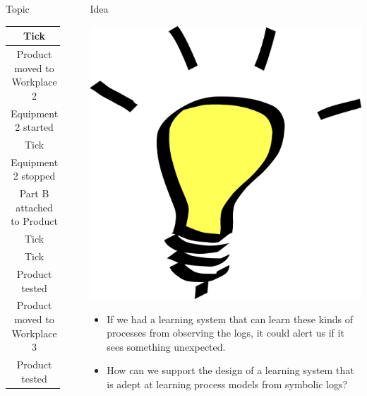 \documentclass[final,xcolor={usenames,x11names}]{beamer}
\newlength{\sepwid}
\newlength{\onecolwid}
\begin{document}
\begin{frame}[t]
\begin{columns}[t]
\begin{column}{\onecolwid}
\begin{alertblock}{Topic}
\begin{center}
{\begin{tabular}{|c|}
  \hline
  \cellcolor{PaleTurquoise1>wheel,4,5}
Tick
  \\
  \hline
  \cellcolor{PaleTurquoise1>wheel,1,5}
Product moved to Workplace 2
  \\
  \hline
  \cellcolor{PaleTurquoise1>wheel,2,5}
Equipment 2 started
  \\
  \hline
  \cellcolor{PaleTurquoise1>wheel,4,5}
Tick
  \\
  \hline
  \cellcolor{PaleTurquoise1>wheel,2,5}
Equipment 2 stopped
  \\
  \hline
  \cellcolor{PaleTurquoise1>wheel,1,5}
Part B attached to Product
  \\
  \hline
  \cellcolor{PaleTurquoise1>wheel,4,5}
Tick
  \\
  \hline
  \cellcolor{PaleTurquoise1>wheel,4,5}
Tick
  \\
  \hline
  \cellcolor{PaleTurquoise1}
Product tested
  \\
  \hline
  \cellcolor{PaleTurquoise1>wheel,1,5}
Product moved to Workplace 3
  \\
  \hline
  \cellcolor{PaleTurquoise1>wheel,1,5}
Product tested
  \\
  \hline
\end{tabular}
}
\end{center}

\end{alertblock}
\end{column}

\begin{column}{\sepwid}\end{column} %

\begin{column}{\onecolwid}
\begin{block}{Idea}

{\centering
\includegraphics[width=4 cm,keepaspectratio=true]{./bulb.png}\par
}

\begin{itemize}
\item If we had a learning system that can learn these kinds of processes from observing the logs, it could alert us if it sees something unexpected.
\item How can we support the design of a learning system that is adept at learning process models from symbolic logs?
\end{itemize}


\end{block}
\end{column}
\end{columns}
\end{frame}
\end{document}
